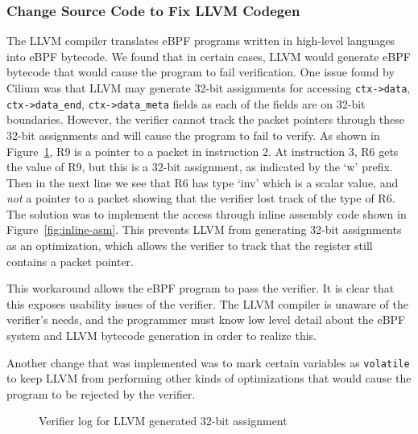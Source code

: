 \subsubsection{Change Source Code to Fix LLVM Codegen}
\label{motivation:llvm-codegen}
The LLVM compiler translates eBPF programs written in high-level languages into eBPF bytecode.
We found that in certain cases, LLVM would generate eBPF bytecode that would cause the program to fail verification.
One issue found by Cilium was that LLVM may generate 32-bit assignments for
    accessing \texttt{ctx->data}, \texttt{ctx->data\_end}, \texttt{ctx->data\_meta} fields as
    each of the fields are on 32-bit boundaries.
However, the verifier cannot track the packet pointers through these 32-bit assignments and
    will cause the program to fail to verify.
As shown in Figure~\ref{fig:inline-error}, R9 is a pointer to a packet in instruction 2.
At instruction 3, R6 gets the value of R9, but this is a 32-bit assignment, as indicated by the `w' prefix.
Then in the next line we see that R6 has type `inv' which is a scalar value, and \emph{not} a pointer to a packet showing that the verifier lost track of the type of R6.
The solution was to implement the access through inline assembly code shown in Figure~\ref{fig:inline-asm}.
This prevents LLVM from generating 32-bit assignments as an optimization, which allows the verifier to track that the register still contains a packet pointer.


This workaround allows the eBPF program to pass the verifier.
It is clear that this exposes usability issues of the verifier.
The LLVM compiler is unaware of the verifier's needs, and the programmer must know low level detail about the eBPF system and LLVM bytecode generation in order to realize this.

Another change that was implemented was to mark certain variables as \texttt{volatile}
to keep LLVM from performing other kinds of optimizations that would cause the program to be rejected by the verifier.

\begin{figure}
    
    \caption{Verifier log for LLVM generated 32-bit assignment}
    \label{fig:inline-error}
\end{figure}

